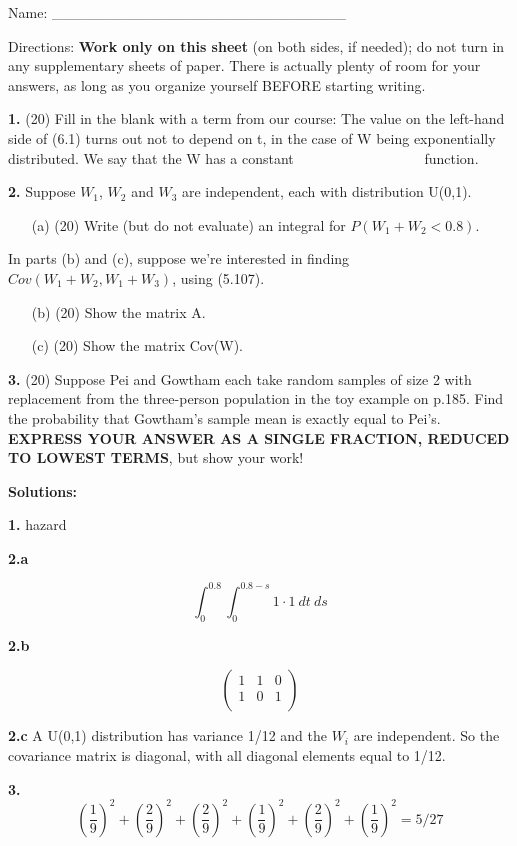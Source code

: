 \documentclass[twocolumn]{article}
\begin{document}
Name: \_\_\_\_\_\_\_\_\_\_\_\_\_\_\_\_\_\_\_\_\_\_\_\_\_\_\_\_

Directions: {\bf \Large Work only on this sheet} (on both sides, if
needed); do not turn in any supplementary sheets of paper. There is
actually plenty of room for your answers, as long as you organize
yourself BEFORE starting writing.

{\bf 1.} (20) Fill in the blank with a term from our course:  The value on
the left-hand side of (6.1) turns out not to depend on t, in the case of
W being exponentially distributed.  We say that the W has a constant
\ \ \ \ \ \ \ \ \ \ \ \ \ \ \ \ \ \  function.

{\bf  2.}  Suppose $W_1$, $W_2$ and $W_3$ are independent, each with
distribution U(0,1).

\begin{itemize}

\item [(a)] (20) Write (but do not evaluate) an integral for $P(W_1+W_2 <
0.8)$.

\end{itemize}

In parts (b) and (c), suppose we're interested in finding
$Cov(W_1+W_2,W_1+W_3)$, using (5.107).

\begin{itemize}

\item [(b)] (20) Show the matrix A.

\item [(c)] (20) Show the matrix Cov(W).

\end{itemize}

{\bf 3.} (20) Suppose Pei and Gowtham each take random samples of size 2 with
replacement from the three-person population in the toy example on
p.185.  Find the probability that Gowtham's sample mean is exactly equal
to Pei's.  {\bf EXPRESS YOUR ANSWER AS A SINGLE FRACTION, REDUCED TO
LOWEST TERMS}, but show your work!

\onecolumn

{\bf Solutions:}

{\bf 1.} hazard

{\bf 2.a}

$$
\int_{0}^{0.8} 
\int_{0}^{0.8-s} 
1 \cdot 1 ~ dt ~ ds
$$

{\bf 2.b}

$$
\left (
\begin{array}{rrr}
    1 & 1 & 0 \\
    1 & 0 & 1 \\
\end{array}
\right )
$$

{\bf 2.c}  A U(0,1) distribution has variance 1/12 and the $W_i$ are
independent.  So the covariance matrix is diagonal, with all diagonal
elements equal to 1/12.

{\bf 3.} 
$$
(\frac{1}{9})^2 +
(\frac{2}{9})^2 +
(\frac{2}{9})^2 +
(\frac{1}{9})^2 +
(\frac{2}{9})^2 +
(\frac{1}{9})^2 
= 5/27
$$
\end{document}
